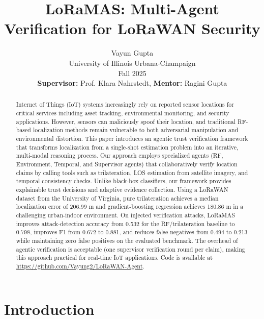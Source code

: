 \documentclass[10pt, twocolumn, letterpaper]{article}
\title{LoRaMAS: Multi-Agent Verification for LoRaWAN Security}
\author{Vayun Gupta \\ University of Illinois Urbana-Champaign \\ Fall 2025 \\ \textbf{Supervisor:} Prof. Klara Nahrstedt, \textbf{Mentor:} Ragini Gupta}
\begin{document}
\maketitle

\begin{abstract}
Internet of Things (IoT) systems increasingly rely on reported sensor locations for critical services including asset tracking, environmental monitoring, and security applications. However, sensors can maliciously spoof their location, and traditional RF-based localization methods remain vulnerable to both adversarial manipulation and environmental distortion. This paper introduces an agentic trust verification framework that transforms localization from a single-shot estimation problem into an iterative, multi-modal reasoning process. Our approach employs specialized agents (RF, Environment, Temporal, and Supervisor agents) that collaboratively verify location claims by calling tools such as trilateration, LOS estimation from satellite imagery, and temporal consistency checks. Unlike black-box classifiers, our framework provides explainable trust decisions and adaptive evidence collection. Using a LoRaWAN dataset from the University of Virginia, pure trilateration achieves a median localization error of 206.99 m and gradient-boosting regression achieves 180.86 m in a challenging urban-indoor environment. On injected verification attacks, LoRaMAS improves attack-detection accuracy from 0.532 for the RF/trilateration baseline to 0.798, improves F1 from 0.672 to 0.881, and reduces false negatives from 0.494 to 0.213 while maintaining zero false positives on the evaluated benchmark. The overhead of agentic verification is acceptable (one supervisor verification round per claim), making this approach practical for real-time IoT applications. Code is available at \url{https://github.com/Vayung2/LoRaWAN-Agent}.
\end{abstract}

\section{Introduction}
\end{document}
